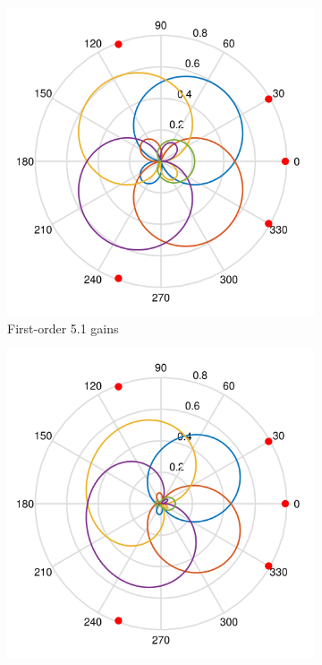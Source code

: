 \documentclass[12pt]{report}
\begin{document}
\begin{figure}[tbp]
  \centering

  \begin{subfigure}{0.32\textwidth}
    \includegraphics[width=\linewidth]{figures/ldspkGains_5p0_o1.png}
    \caption{\centering First-order 5.1 gains}
  \end{subfigure}
  \hfill
  \begin{subfigure}{0.32\textwidth}
    \includegraphics[width=\linewidth]{figures/ldspkGains_5p0_o2.png}

\end{subfigure}
\end{figure}
\end{document}
